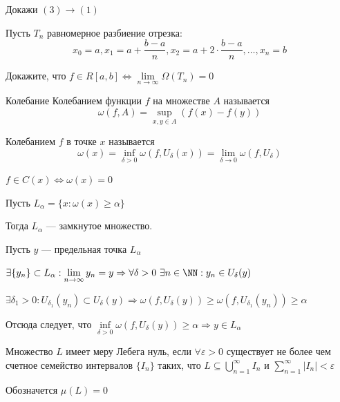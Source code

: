 \begin{exercise}{}{}
    Докажи \( (3) \to (1) \)
\end{exercise}

\begin{exercise}{}{}
    Пусть \( T_n \) равномерное разбиение отрезка:
    \[
        x_0 = a, x_1 = a + \frac{b - a}{n}, x_2 = a + 2 \cdot \frac{b - a}{n}, \ldots, x_n = b
    \]

    Докажите, что \( f \in R[a, b] \Leftrightarrow \lim\limits_{n \to \infty} \Omega(T_n) = 0 \)
\end{exercise}

\begin{defn}{Колебание}{}
    Колебанием функции \( f \) на множестве \( A \) называется
    \[
        \omega(f, A) = \sup\limits_{x, y \in A} (f(x) - f(y))
    \]

    Колебанием \( f \) в точке \( x \) называется
    \[
        \omega(x) = \inf\limits_{\delta > 0} \omega (f, U_{\delta} (x)) = \lim\limits_{\delta \to 0} \omega(f, U_{\delta})
    \]

\end{defn}

\begin{exercise}{}{}
    \( f \in C(x) \Leftrightarrow \omega(x) = 0 \)
\end{exercise}

\begin{thrm}{}{}
    Пусть \( L_{\alpha} = \{ x : \omega(x) \geq \alpha \} \)

    Тогда \( L_{\alpha} \) --- замкнутое множество.
\end{thrm}

Пусть \( y \) --- предельная точка \( L_{\alpha} \)

\(
    \exists \{ y_n \} \subset L_{\alpha} : \lim\limits_{n \to \infty} y_n = y
    \Rightarrow
    \forall \delta > 0 \ \exists n \in \NN : y_n \in U_{\delta} (y)
\)

\(
    \exists \delta_1 > 0 : U_{\delta_1} (y_n) \subset U_{\delta} (y)
    \Rightarrow
    \omega(f, U_{\delta}(y)) \geq \omega(f, U_{\delta_1} (y_n)) \geq \alpha
\)

Отсюда следует, что
\(
    \inf\limits_{\delta > 0} \omega(f, U_{\delta}(y)) \geq \alpha
    \Rightarrow
    y \in L_{\alpha}
\)

\begin{defn}{}{}
    Множество \( L \) имеет меру Лебега нуль,
    если \( \forall \varepsilon > 0 \)
    существует не более чем счетное семейство интервалов \( \{ I_n \} \)
    таких, что \( L \subseteq \bigcup\limits_{n = 1}^{\infty} I_n \)
    и \( \sum\limits_{n = 1}^{\infty} | I_n | < \varepsilon \)

    Обозначется \( \mu(L) = 0 \)
\end{defn}

